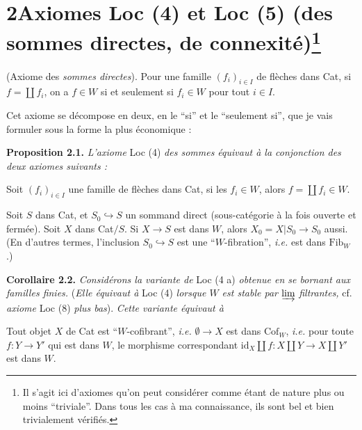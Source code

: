 \documentclass[11pt]{article}
\newcommand{\printedpage}[1]{\marginpar{\footnotesize p.~#1}}
\newcommand{\msp}[1]{\marginpar{\footnotesize [#1]}}
\begin{document}
\printedpage{5}
\section*{2\quad Axiomes Loc (4) et Loc (5) (des sommes directes, de connexité)\protect\footnote{Il s'agit ici d'axiomes qu'on peut considérer comme étant de nature plus ou moins “triviale”. Dans tous les cas à ma connaissance, ils sont bel et bien trivialement vérifiés.}}

\begin{description}[leftmargin=7em, labelwidth=6em]
\item[Loc (4)] (Axiome des \textit{sommes directes}). Pour une famille $(f_i)_{i\in I}$ de flèches dans Cat, si $f = \coprod f_i$, on a $f \in W$ si et seulement si $f_i \in W$ pour tout $i \in I$.
\end{description}

Cet axiome se décompose en deux, en le “si” et le “seulement si”, que je vais formuler sous la forme la plus économique :

\textbf{Proposition 2.1.} \textit{L'axiome} Loc (4) \textit{des sommes équivaut à la conjonction des deux axiomes suivants :}

\begin{description}[leftmargin=7em, labelwidth=6em]
\item[Loc (4 a)] \msp{page 9}Soit $(f_i)_{i\in I}$ une famille de flèches dans Cat, si les $f_i \in W$, alors $f = \coprod f_i \in W$.
\item[Loc (4 b)] Soit $S$ dans Cat, et $S_0 \hookrightarrow S$ un sommand direct (sous-catégorie à la fois ouverte et fermée). Soit $X$ dans Cat$/S$. Si $X \longrightarrow S$ est dans $W$, alors $X_0 = X|S_0 \longrightarrow S_0$ aussi. (En d'autres termes, l'inclusion $S_0 \hookrightarrow S$ est une “$W$-fibration”, \textit{i.e.} est dans $\mathrm{Fib}_W$.)
\end{description}

\textbf{Corollaire 2.2.} \textit{Considérons la variante de} Loc (4 a) \textit{obtenue en se bornant aux familles finies.} (\textit{Elle équivaut à} Loc (4) \textit{lorsque $W$ est stable par} $\varinjlim$ \textit{filtrantes,} cf. \textit{axiome} Loc (8) \textit{plus bas}). \textit{Cette variante équivaut à}

\begin{description}[leftmargin=7.5em, labelwidth=6.5em]
\item[Loc (4 a$_0$)] Tout objet $X$ de Cat est “$W$-cofibrant”, \textit{i.e.} $\emptyset \longrightarrow X$ est dans $\mathrm{Cof}_W$, \textit{i.e.} pour toute $f : Y \longrightarrow Y'$ qui est dans $W$, le morphisme correspondant $\mathrm{id}_X \amalg f : X \amalg Y \longrightarrow X \amalg Y'$ est dans $W$.
\end{description}
\end{document}
